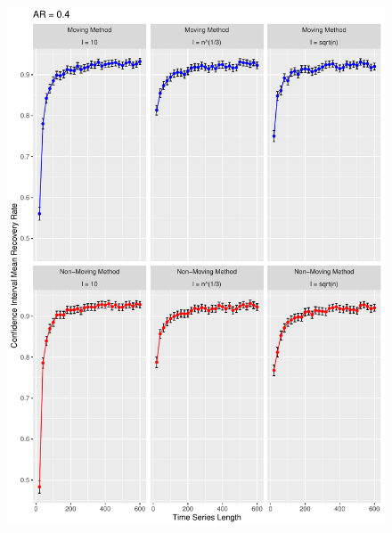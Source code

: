 \documentclass[12pt, letterpaper, titlepage]{article}
\begin{document}
\begin{figure}[p]
  \centering
  \includegraphics[width=\textwidth]{ar_0.4}
  \caption{}
  \label{fig:ar_0.4}
\end{figure}
\end{document}
